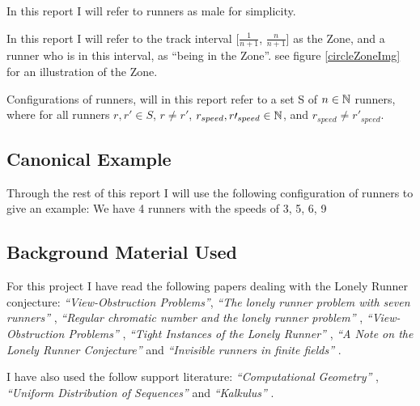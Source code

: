 In this report I will refer to runners as male for simplicity.

\begin{defi}
\label{def:theZone}
In this report I will refer to the track interval [$\frac{1}{n + 1}$, $\frac{n}{n+1}$] as the Zone, and a runner who is in this interval, as ``being in the Zone''. see figure \ref{circleZoneImg} for an illustration of the Zone.
\end{defi}

\begin{defi}
\label{def:config}
Configurations of runners, will in this report refer to a set S of $n \in \mathbb{N}$ runners, where for all runners $r, r\prime \in S$, $r \neq r\prime$, $r_{speed}, r\prime_{speed} \in \mathbb{N}$, and $r_{speed} \neq r\prime_{speed}$.
\end{defi}

\subsection{Canonical Example}
Through the rest of this report I will use the following configuration
of runners to give an example:
We have 4 runners with the speeds of 3, 5, 6, 9

\subsection{Background Material Used}
\label{background}
For this project I have read the following papers dealing with the Lonely Runner conjecture: \emph{``View-Obstruction Problems''}\cite{Bienia97flows.view-obstructions}, \emph{``The lonely runner problem with seven runners''} \cite{serra_thelonely}, \emph{``Regular chromatic number and the lonely runner problem''} \cite{Barajas2007479}, \emph{``View-Obstruction Problems''} \cite{springerlink:10.1007/BF01832623}, \emph{``Tight Instances of the Lonely Runner''} \cite{Goddyn96tightinstances}, \emph{``A Note on the Lonely Runner Conjecture''} \cite{ANote} and \emph{``Invisible runners in finite fields''} \cite{invis}.

I have also used the follow support literature:
\emph{``Computational Geometry''} \cite{citeulike:3347056}, \emph{``Uniform Distribution of Sequences''} \cite{uniform} and \emph{``Kalkulus''} \cite{kalkulus}.

